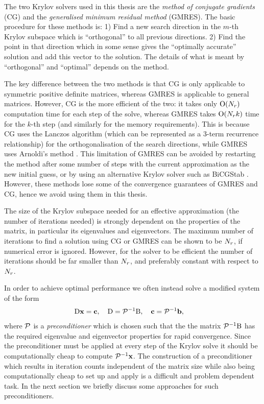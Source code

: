 The two Krylov solvers used in this thesis are the \emph{method of conjugate gradients} (CG) and the \emph{generalised minimum residual method} (GMRES).
The basic procedure for these methods is:
1) Find a new search direction in the $m$-th Krylov subspace which is ``orthogonal'' to all previous directions.
2) Find the point in that direction which in some sense gives the ``optimally accurate'' solution and add this vector to the solution.
The details of what is meant by ``orthogonal'' and ``optimal'' depends on the method.

The key difference between the two methods is that CG is only applicable to symmetric positive definite matrices, whereas GMRES is applicable to general matrices.
However, CG is the more efficient of the two: it takes only $\mathrm{O}{\left( N_r \right)}$ computation time for each step of the solve, whereas GMRES takes $\mathrm{O}{\left( N_r k \right)}$ time for the $k$-th step (and similarly for the memory requirements).
This is because CG uses the Lanczos algorithm (which can be represented as a 3-term recurrence relationship) for the orthogonalisation of the search directions, while GMRES uses Arnoldi's method \cite[153]{Saad2000}.
This limitation of GMRES can be avoided by restarting the method after some number of steps with the current approximation as the new initial guess, or by using an alternative Krylov solver such as BiCGStab \cite[172]{HowardElmanDavidSilvester2006}.
However, these methods lose some of the convergence guarantees of GMRES and CG, hence we avoid using them in this thesis.

The size of the Krylov subspace needed for an effective approximation (\ie the number of iterations needed) is strongly dependent on the properties of the matrix, in particular its eigenvalues and eigenvectors.
The maximum number of iterations to find a solution using CG or GMRES can be shown to be $N_r$, if numerical error is ignored.
However, for the solver to be efficient the number of iterations should be far smaller than $N_r$, and preferably constant with respect to $N_r$.

In order to achieve optimal performance we often instead solve a modified system of the form
\begin{equation}
  \begin{aligned}
    \mathrm{D} \boldsymbol{\mathrm{x}} &= {\boldsymbol{\mathrm{c}}}, \quad \mathrm{D} = \mathcal{P}^{-1} \mathrm{B}, \quad {\boldsymbol{\mathrm{c}}} = \mathcal{P}^{-1} {\boldsymbol{\mathrm{b}}},
  \end{aligned}
\end{equation}
where $\mathcal{P}$ is a \emph{preconditioner} which is chosen such that the the matrix $\mathcal{P}^{-1} \mathrm{B}$ has the required eigenvalue and eigenvector properties for rapid convergence.
Since the preconditioner must be applied at every step of the Krylov solve it should be computationally cheap to compute $\mathcal{P}^{-1}\boldsymbol{\mathrm{x}}$.
The construction of a preconditioner which results in iteration counts independent of the matrix size while also being computationally cheap to set up and apply is a difficult and problem dependent task.
In the next section we briefly discuss some approaches for such preconditioners.

